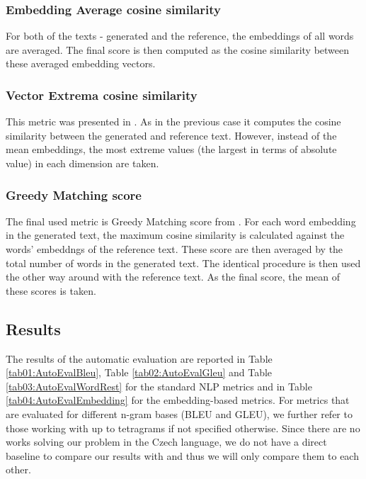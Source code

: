\subsubsection*{Embedding Average cosine similarity}
For both of the texts - generated and the reference, the embeddings of all words are averaged. The final score is then computed as the cosine similarity between these averaged embedding vectors.

\subsubsection*{Vector Extrema cosine similarity}
This metric was presented in \citet{forgues2014bootstrapping}. As in the previous case it computes the cosine similarity between the generated and reference text. However, instead of the mean embeddings, the most extreme values (the largest in terms of absolute value) in each dimension are taken.

\subsubsection*{Greedy Matching score}
The final used metric is Greedy Matching score from \citet{rus2012optimal}. For each word embedding in the generated text, the maximum cosine similarity is calculated against the words' embeddngs of the reference text. These score are then averaged by the total number of words in the generated text. The identical procedure is then used the other way around with the reference text. As the final score, the mean of these scores is taken.

\subsection{Results}
The results of the automatic evaluation are reported in Table \ref{tab01:AutoEvalBleu}, Table \ref{tab02:AutoEvalGleu} and Table \ref{tab03:AutoEvalWordRest} for the standard NLP metrics and in Table \ref{tab04:AutoEvalEmbedding} for the embedding-based metrics. For metrics that are evaluated for different n-gram bases (BLEU and GLEU), we further refer to those working with up to tetragrams if not specified otherwise. Since there are no works solving our problem in the Czech language, we do not have a direct baseline to compare our results with and thus we will only compare them to each other.\\

